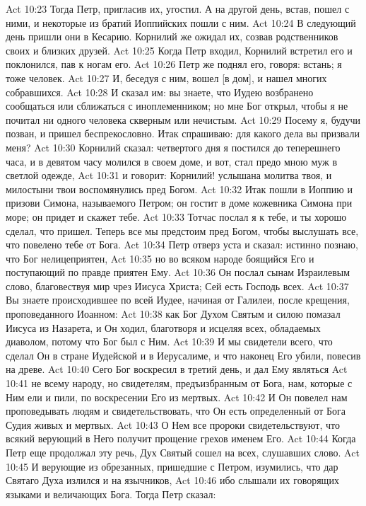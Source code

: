Act 10:23  Тогда Петр, пригласив их, угостил. А на другой день, встав, пошел с ними, и некоторые из братий Иоппийских пошли с ним.
Act 10:24  В следующий день пришли они в Кесарию. Корнилий же ожидал их, созвав родственников своих и близких друзей.
Act 10:25  Когда Петр входил, Корнилий встретил его и поклонился, пав к ногам его.
Act 10:26  Петр же поднял его, говоря: встань; я тоже человек.
Act 10:27  И, беседуя с ним, вошел [в дом], и нашел многих собравшихся.
Act 10:28  И сказал им: вы знаете, что Иудею возбранено сообщаться или сближаться с иноплеменником; но мне Бог открыл, чтобы я не почитал ни одного человека скверным или нечистым.
Act 10:29  Посему я, будучи позван, и пришел беспрекословно. Итак спрашиваю: для какого дела вы призвали меня?
Act 10:30  Корнилий сказал: четвертого дня я постился до теперешнего часа, и в девятом часу молился в своем доме, и вот, стал предо мною муж в светлой одежде,
Act 10:31  и говорит: Корнилий! услышана молитва твоя, и милостыни твои воспомянулись пред Богом.
Act 10:32  Итак пошли в Иоппию и призови Симона, называемого Петром; он гостит в доме кожевника Симона при море; он придет и скажет тебе.
Act 10:33  Тотчас послал я к тебе, и ты хорошо сделал, что пришел. Теперь все мы предстоим пред Богом, чтобы выслушать все, что повелено тебе от Бога.
Act 10:34  Петр отверз уста и сказал: истинно познаю, что Бог нелицеприятен,
Act 10:35  но во всяком народе боящийся Его и поступающий по правде приятен Ему.
Act 10:36  Он послал сынам Израилевым слово, благовествуя мир чрез Иисуса Христа; Сей есть Господь всех.
Act 10:37  Вы знаете происходившее по всей Иудее, начиная от Галилеи, после крещения, проповеданного Иоанном:
Act 10:38  как Бог Духом Святым и силою помазал Иисуса из Назарета, и Он ходил, благотворя и исцеляя всех, обладаемых диаволом, потому что Бог был с Ним.
Act 10:39  И мы свидетели всего, что сделал Он в стране Иудейской и в Иерусалиме, и что наконец Его убили, повесив на древе.
Act 10:40  Сего Бог воскресил в третий день, и дал Ему являться
Act 10:41  не всему народу, но свидетелям, предъизбранным от Бога, нам, которые с Ним ели и пили, по воскресении Его из мертвых.
Act 10:42  И Он повелел нам проповедывать людям и свидетельствовать, что Он есть определенный от Бога Судия живых и мертвых.
Act 10:43  О Нем все пророки свидетельствуют, что всякий верующий в Него получит прощение грехов именем Его.
Act 10:44  Когда Петр еще продолжал эту речь, Дух Святый сошел на всех, слушавших слово.
Act 10:45  И верующие из обрезанных, пришедшие с Петром, изумились, что дар Святаго Духа излился и на язычников,
Act 10:46  ибо слышали их говорящих языками и величающих Бога. Тогда Петр сказал:
